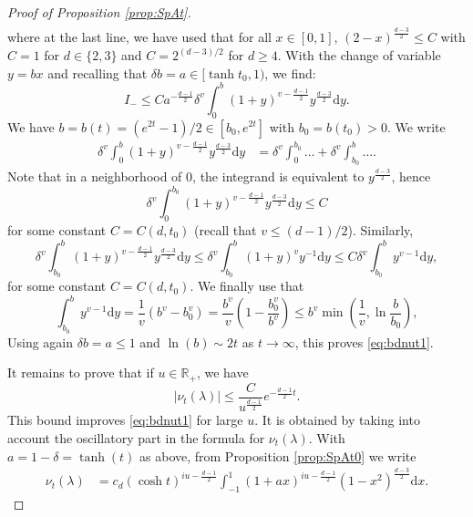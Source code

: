 \documentclass[10pt,a4paper]{amsart}
\newcommand{\R}{\mathds{R}}
\renewcommand{\d}{\mathrm{d}}
\begin{document}
\begin{proof}[Proof of Proposition \ref{prop:SpAt}]
\begin{align*}
	\end{align*}		
	where at the last line, we have used that for all $x \in [0,1]$, $(2 -x)^{ \frac{d - 3}{2}} \leq C$ with $C = 1$ for $d \in \{2,3\}$ and $C = 2^{(d-3)/2}$ for $d \geq 4$. With the change of variable $y = bx$ and recalling that $\delta b = a \in [\tanh t_0,1)$, we find: 
	$$
	I_- \leq C a^{-\frac{d-1}{2}} \delta^{v}  \int_{0}^{b} ( 1 + y )^{v - \frac{d-1}{2}}  y  ^{ \frac{d - 3}{2}}\d y.
	$$
	We have $b = b(t) = (e^{2t} - 1)/ 2 \in [b_0,e^{2t}]$ with $b_0 = b(t_0) >0$. We write
	\begin{align*}
		\delta^{v}  \int_{0}^{b} ( 1 + y )^{v - \frac{d-1}{2}}  y  ^{ \frac{d - 3}{2}}\d y & = \delta^{v}  \int_{0}^{b_0} \dots +  \delta^{v}  \int_{b_0}^{b} \dots.
	\end{align*}
	Note that in a neighborhood of $0$, the integrand is equivalent to $y  ^{ \frac{d - 3}{2}}$, hence 
	$$
	\delta^{v}  \int_{0}^{b_0} ( 1 + y )^{v - \frac{d-1}{2}}  y  ^{ \frac{d - 3}{2}}\d y \leq C
	$$
	for some constant $C = C(d,t_0)$ (recall that $v \leq (d-1)/2$). Similarly, 
	$$
	\delta^{v}  \int_{b_0}^{b} ( 1 + y )^{v - \frac{d-1}{2}}  y  ^{ \frac{d - 3}{2}}\d y \leq \delta^{v}  \int_{b_0}^{b} ( 1 + y )^{v} y  ^{ -1} \d y \leq C \delta^{v}  \int_{b_0}^{b} y  ^{v -1} \d y,
	$$
	for some constant $C = C(d,t_0)$.  We finally use that
	$$
	\int_{b_0}^{b} y  ^{v -1} \d y  = \frac{1}{v}(b^v - b_0^v)= \frac{b^v}{v}\left(1 - \frac{b_0^v}{b^v}\right) \leq b^v \min \left( \frac{1}{v} , \ln \frac{b}{b_0}\right),
	$$
	Using again $\delta b = a \leq 1$ and $\ln (b) \sim 2t$ as $t \to \infty$, this proves \eqref{eq:bdnut1}.
	
	It remains to prove that if $u \in \R_+$, we have
	\begin{equation}\label{eq:bdnut2}
		|\nu_t(\lambda)|  \leq   \frac{C}{u^{\frac{d-1}{2}}}   e^{-\frac{d-1}{2}t}. 
	\end{equation}
	This bound improves  \eqref{eq:bdnut1} for large $u$. It is obtained by taking into account the oscillatory part in the formula for $\nu_t(\lambda)$. With $ a = 1- \delta = \tanh (t)$ as above, from Proposition \ref{prop:SpAt0} we write
	\begin{align*}
		\nu_t (\lambda)  &= c_d (\cosh t )^{iu - \frac{d-1}{2}}   \int_{-1}^{1} ( 1+ a x)^{iu - \frac{d-1}{2}} ( 1- x^2)^{ \frac{d - 3}{2}} \d x.
	\end{align*}


\end{proof}
\end{document}
